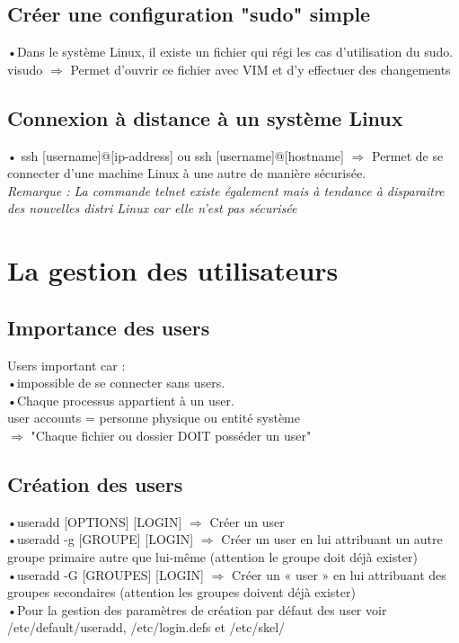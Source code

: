 \documentclass[a4paper, 11pt, french, oneside]{book}
\begin{document}
\pagebreak 	
	
	\section{Créer une configuration "sudo" simple}
	•Dans le système Linux, il existe un fichier qui régi les cas d’utilisation du sudo.\\
	{\color{red}visudo} $\Rightarrow$ Permet d'ouvrir ce fichier avec VIM et d'y effectuer des changements\\
	
	
	\section{Connexion à distance à un système Linux}
•\color{red}
	ssh [username]@[ip-address] {\color{black}ou} ssh [username]@[hostname] 
\color{black}
$\Rightarrow$ Permet de se connecter d'une machine Linux à une autre de manière sécurisée.\\
	
\textit{Remarque : La commande {\color{red}telnet} existe également mais à tendance à disparaitre des nouvelles distri Linux car elle n'est pas sécurisée}

\pagebreak 
	
	


	


\chapter{La gestion des utilisateurs}
	\section{\Large Importance des users} 
    Users important car : \\
    	•impossible de se connecter sans users. \\
	•Chaque processus appartient à un user. \\
			
user accounts = personne physique ou entité système\\
$\Rightarrow$ "Chaque fichier ou dossier DOIT posséder un user"
	\section{Création des users}
	•{\color{red}useradd [OPTIONS] [LOGIN]} $\Rightarrow$ Créer un user \\
	•{\color{red}useradd -g [GROUPE] [LOGIN] } $\Rightarrow$ Créer un user en lui attribuant un autre groupe primaire autre que lui-même (attention le groupe doit déjà exister)\\
	•{\color{red}useradd -G [GROUPES] [LOGIN]} $\Rightarrow$ Créer un « user » en lui attribuant des groupes secondaires  (attention les groupes doivent déjà exister)\\
	•Pour la gestion des paramètres de création par défaut des user voir {\color{blue}/etc/default/useradd}, {\color{blue}/etc/login.defs} et {\color{blue} /etc/skel/}
	
\end{document}
